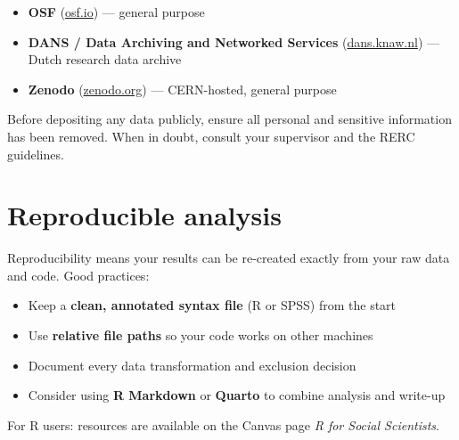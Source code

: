 \documentclass[
  11pt,
  a4paper,
]{scrbook}
\providecommand{\tightlist}{%
  \setlength{\itemsep}{0pt}\setlength{\parskip}{0pt}}\usepackage{longtable,booktabs,array}
\begin{document}
\begin{itemize}
\tightlist
\item
  \textbf{OSF} (\href{https://osf.io}{osf.io}) --- general purpose
\item
  \textbf{DANS / Data Archiving and Networked Services}
  (\href{https://dans.knaw.nl}{dans.knaw.nl}) --- Dutch research data
  archive
\item
  \textbf{Zenodo} (\href{https://zenodo.org}{zenodo.org}) ---
  CERN-hosted, general purpose
\end{itemize}

\begin{tcolorbox}[enhanced jigsaw, bottomrule=.15mm, opacityback=0, toprule=.15mm, colframe=quarto-callout-warning-color-frame, left=2mm, rightrule=.15mm, title=\textcolor{quarto-callout-warning-color}{\faExclamationTriangle}\hspace{0.5em}{Never share personal data publicly}, colbacktitle=quarto-callout-warning-color!10!white, bottomtitle=1mm, colback=white, breakable, toptitle=1mm, titlerule=0mm, leftrule=.75mm, arc=.35mm, opacitybacktitle=0.6, coltitle=black]

Before depositing any data publicly, ensure all personal and sensitive
information has been removed. When in doubt, consult your supervisor and
the RERC guidelines.

\end{tcolorbox}

\section{Reproducible analysis}\label{reproducible-analysis}

Reproducibility means your results can be re-created exactly from your
raw data and code. Good practices:

\begin{itemize}
\tightlist
\item
  Keep a \textbf{clean, annotated syntax file} (R or SPSS) from the
  start
\item
  Use \textbf{relative file paths} so your code works on other machines
\item
  Document every data transformation and exclusion decision
\item
  Consider using \textbf{R Markdown} or \textbf{Quarto} to combine
  analysis and write-up
\end{itemize}

For R users: resources are available on the Canvas page \emph{R for
Social Scientists}.
\end{document}
